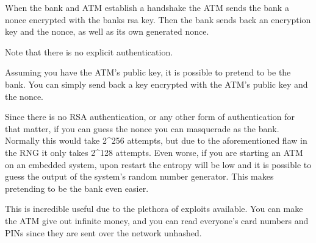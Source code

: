\documentclass{article}
\begin{document}
When the bank and ATM establish a handshake the ATM sends the bank a 
nonce encrypted with the banks rsa key. Then the bank sends back an
encryption key and the nonce, as well as its own generated nonce.

Note that there is no explicit authentication.

Assuming you have the ATM's public key, it is possible to pretend to be the bank. You can simply send back a key encrypted with the ATM's public key and the nonce.

Since there is no RSA authentication, or any other form of authentication for that matter,
if you can guess the nonce you can masquerade as the bank. Normally this would
take 2^{256} attempts, but due to the aforementioned flaw in the RNG it only
takes 2^{128} attempts. Even worse, if you are starting an ATM on an embedded
system, upon restart the entropy will be low and it is possible to guess
the output of the system's random number generator. This makes pretending to be the bank even easier.

This is incredible useful due to the plethora of exploits available. You can 
make the ATM give out infinite money, and you can read everyone's card numbers 
and PINs since they are sent over the network unhashed.
\end{document}
